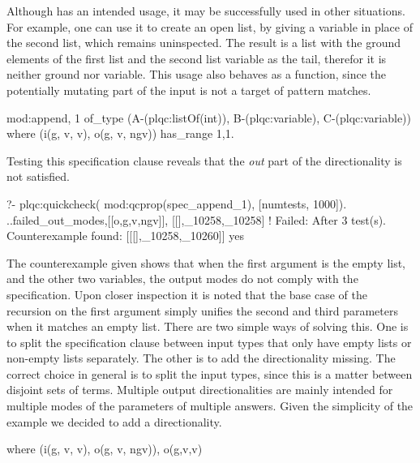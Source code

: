 Although  has an intended usage, it may be successfully
used in other situations.
%
For example, one can use it to create an open list, by giving a variable
in place of the second list, which remains uninspected.
%
The result is a list with the ground elements of the first list and the
second list variable as the tail, therefor it is neither ground nor
variable.
%
This usage also behaves as a function, since the potentially mutating
part of the input is not a target of pattern matches.
%
\begin{yapcode}
 {mod:append, 1}
   of_type (A-(plqc:listOf(int)),
     B-(plqc:variable), C-(plqc:variable))
   where (i(g, v, v), o(g, v, ngv))
   has_range {1,1}.
\end{yapcode}
%
Testing this specification clause reveals that the \emph{out} part of
the directionality is not satisfied.
%
\begin{yapcode}
   ?- plqc:quickcheck(
        mod:qcprop(spec_append_1),
        [{numtests, 1000}]).
 ..{failed_out_modes,[[o,g,v,ngv]],
                     [[],_10258,_10258]}
 !
 Failed: After 3 test(s).
 Counterexample found: [[[],_10258,_10260]] 
 yes
\end{yapcode}
%
The counterexample given shows that when the first argument is the empty
list, and the other two variables, the output modes do not comply with
the specification.
%
Upon closer inspection it is noted that the base case of the recursion
on the first argument simply unifies the second and third parameters
when it matches an empty list.
%
There are two simple ways of solving this.
%
One is to split the specification clause between input types that only
have empty lists or non-empty lists separately.
%
The other is to add the directionality missing.
%
The correct choice in general is to split the input types, since this is
a matter between disjoint sets of terms.
%
Multiple output directionalities are mainly intended for multiple modes
of the parameters of multiple answers.
%
Given the simplicity of the example we decided to add a directionality.
%
\begin{yapcode}
   where (i(g, v, v), o(g, v, ngv)), o(g,v,v)
\end{yapcode}




